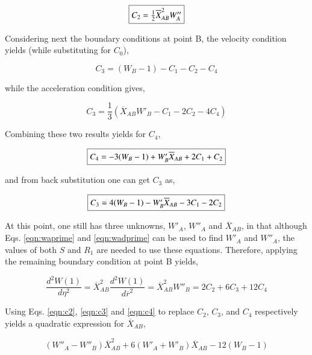 \begin{equation}
	\fbox{$
	C_2 = \frac{1}{2}\overline{X}_{AB}^2W''_A
	$}
\label{eqn:c2}
\end{equation}

	Considering next the boundary conditions at point B, the velocity condition yields 
(while substituting for $C_0$),

\begin{displaymath}
	C_3 = (W_B - 1) - C_1 - C_2 - C_4
\end{displaymath}

	while the acceleration condition gives,

\begin{displaymath}
	C_3 = \frac{1}{3}(\overline{X}_{AB}W'_B - C_1 - 2C_2 - 4C_4)
\end{displaymath}

	Combining these two results yields for $C_4$,

\begin{equation}
	\fbox{$
	C_4 = -3(W_B -1) + W'_B\overline{X}_{AB} + 2C_1 + C_2
	$}
\label{eqn:c4}
\end{equation}

	and from back substitution one can get $C_3$ as,

\begin{equation}
	\fbox{$
	C_3 = 4(W_B -1) - W'_B\overline{X}_{AB} - 3C_1 - 2C_2
	$}
\label{eqn:c3}
\end{equation}

	At this point, one still has three unknowns, $W'_A$, $W''_A$ and $\overline{X}_{AB}$, 
in that although Eqs. \ref{eqn:waprime} and \ref{eqn:wadprime} can be used to find $W'_A$ and 
$W''_A$, the values of both $S$ and $R_1$ are needed to use these equations.  Therefore,
applying the remaining boundary condition at point B yields,

\begin{displaymath}
	\frac{d^2W(1)}{d\eta ^2} = \overline{X}_{AB}^2\frac{d^2W(1)}{d\overline{r}^2}
	= \overline{X}_{AB}^2 W''_B = 2C_2 + 6C_3 + 12C_4
\end{displaymath} 

	Using Eqs. \ref{eqn:c2}, \ref{eqn:c3} and \ref{eqn:c4} to replace $C_2$, $C_3$, and $C_4$ 
respectively yields a quadratic expression for $\overline{X}_{AB}$,

\begin{equation}
	(W''_A - W''_B)\overline{X}_{AB}^2 + 6(W'_A + W'_B)\overline{X}_{AB} - 12(W_B - 1)
\label{eqn:xabone}
\end{equation}

